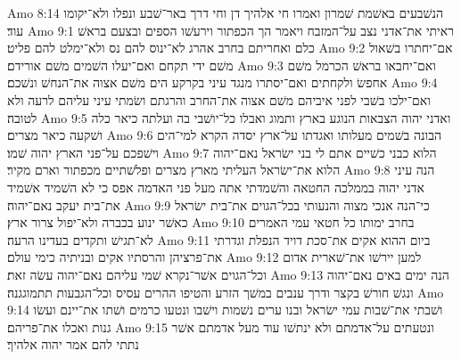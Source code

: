 Amo 8:14  הנשׁבעים באשׁמת שׁמרון ואמרו חי אלהיך דן וחי דרך באר־שׁבע ונפלו ולא־יקומו עוד׃
Amo 9:1  ראיתי את־אדני נצב על־המזבח ויאמר הך הכפתור וירעשׁו הספים ובצעם בראשׁ כלם ואחריתם בחרב אהרג לא־ינוס להם נס ולא־ימלט להם פליט׃
Amo 9:2  אם־יחתרו בשׁאול משׁם ידי תקחם ואם־יעלו השׁמים משׁם אורידם׃
Amo 9:3  ואם־יחבאו בראשׁ הכרמל משׁם אחפשׂ ולקחתים ואם־יסתרו מנגד עיני בקרקע הים משׁם אצוה את־הנחשׁ ונשׁכם׃
Amo 9:4  ואם־ילכו בשׁבי לפני איביהם משׁם אצוה את־החרב והרגתם ושׂמתי עיני עליהם לרעה ולא לטובה׃
Amo 9:5  ואדני יהוה הצבאות הנוגע בארץ ותמוג ואבלו כל־יושׁבי בה ועלתה כיאר כלה ושׁקעה כיאר מצרים׃
Amo 9:6  הבונה בשׁמים מעלותו ואגדתו על־ארץ יסדה הקרא למי־הים וישׁפכם על־פני הארץ יהוה שׁמו׃
Amo 9:7  הלוא כבני כשׁיים אתם לי בני ישׂראל נאם־יהוה הלוא את־ישׂראל העליתי מארץ מצרים ופלשׁתיים מכפתור וארם מקיר׃
Amo 9:8  הנה עיני אדני יהוה בממלכה החטאה והשׁמדתי אתה מעל פני האדמה אפס כי לא השׁמיד אשׁמיד את־בית יעקב נאם־יהוה׃
Amo 9:9  כי־הנה אנכי מצוה והנעותי בכל־הגוים את־בית ישׂראל כאשׁר ינוע בכברה ולא־יפול צרור ארץ׃
Amo 9:10  בחרב ימותו כל חטאי עמי האמרים לא־תגישׁ ותקדים בעדינו הרעה׃
Amo 9:11  ביום ההוא אקים את־סכת דויד הנפלת וגדרתי את־פרציהן והרסתיו אקים ובניתיה כימי עולם׃
Amo 9:12  למען יירשׁו את־שׁארית אדום וכל־הגוים אשׁר־נקרא שׁמי עליהם נאם־יהוה עשׂה זאת׃
Amo 9:13  הנה ימים באים נאם־יהוה ונגשׁ חורשׁ בקצר ודרך ענבים במשׁך הזרע והטיפו ההרים עסיס וכל־הגבעות תתמוגגנה׃
Amo 9:14  ושׁבתי את־שׁבות עמי ישׂראל ובנו ערים נשׁמות וישׁבו ונטעו כרמים ושׁתו את־יינם ועשׂו גנות ואכלו את־פריהם׃
Amo 9:15  ונטעתים על־אדמתם ולא ינתשׁו עוד מעל אדמתם אשׁר נתתי להם אמר יהוה אלהיך׃


